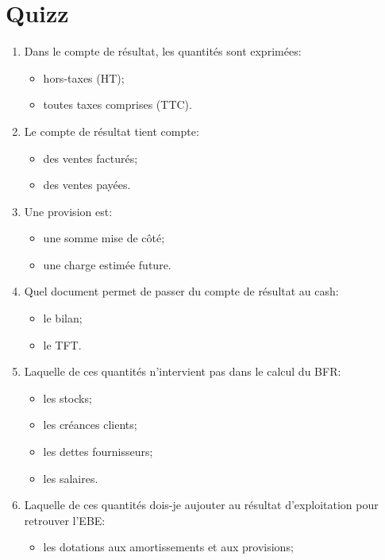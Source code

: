 \chapter{Quizz}


\begingroup

\renewcommand\labelitemi{\hspace*{1em}$\square$}

\begin{enumerate}
  \setlength{\itemsep}{1em}
  \item Dans le compte de résultat, les quantités sont exprimées:
    \begin{itemize}
     \item hors-taxes (HT);
     \item toutes taxes comprises (TTC).
    \end{itemize}
  \item Le compte de résultat tient compte:
    \begin{itemize}
     \item des ventes facturés;
     \item des ventes payées.
    \end{itemize}
  \item Une provision est:
    \begin{itemize}
     \item une somme mise de côté;
     \item une charge estimée future.
    \end{itemize}
  \item Quel document permet de passer du compte de résultat au cash:
    \begin{itemize}
     \item le bilan;
     \item le TFT.
    \end{itemize}
  \item Laquelle de ces quantités n'intervient pas dans le calcul du BFR:
    \begin{itemize}
     \item les stocks;
     \item les créances clients;
	 \item les dettes fournisseurs;
	 \item les salaires.
    \end{itemize}
  \item Laquelle de ces quantités dois-je aujouter au résultat d'exploitation pour retrouver l'EBE:
    \begin{itemize}
     \item les dotations aux amortissements et aux provisions;

\end{itemize}
\end{enumerate}
